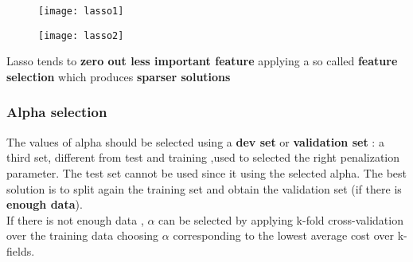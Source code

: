 \begin{figure}[H]
  \centering
  \texttt{[image: lasso1]}
  \end{figure}

\begin{figure}[H]
  \centering
  \texttt{[image: lasso2]}
  \end{figure}
Lasso tends to \textbf{zero out less important feature} applying a so called \textbf{feature selection} which produces \textbf{sparser solutions}

\subsubsection{Alpha selection} 
The values of alpha should be selected using a \textbf{dev set} or \textbf{validation set} : a third set, different from test and training ,used to selected the right penalization parameter. The test set cannot be used since it using the selected alpha. The best solution is to split again the training set and obtain the validation set (if there is \textbf{enough data}).\\
If there is not enough data , $\alpha$ can be selected by applying k-fold cross-validation over the training data choosing $\alpha$ corresponding to the lowest average cost over k-fields.
  